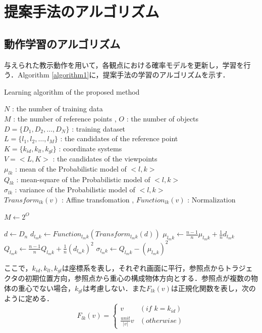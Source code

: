 ﻿\appendix
\chapter{提案手法のアルゴリズム}\label{appendix3}

\section{動作学習のアルゴリズム}

与えられた教示動作を用いて，各観点における確率モデルを更新し，学習を行う．Algorithm \ref{algorithm1}に，提案手法の学習のアルゴリズムを示す．
	\begin{algorithm}[b]
		\caption{ Learning algorithm of the proposed method}
		\label{algorithm1}
		\begin{algorithmic}
			\REQUIRE
				$N$ : the number of training data \\
				$M$ : the number of reference points , 
				$O$ : the number of objects \\
				$D = \{D_{1} , D_{2} , \ldots , D_{N}\}$ : training dataset \\
				$L = \{l_{1} , l_{2} , \ldots , l_{M}\}$ : the candidates of the reference point \\
				$K = \{k_{id} , k_{lt} , k_{gl}\}$ : coordinate systems \\
				$V = <L , K>$ : the candidates of the viewpoints \\
				$μ_{lk}$ : mean of the Probabilistic model of $<l , k>$ \\
				$Q_{lk}$ : mean-square of the Probabilistic model of $<l , k>$ \\
				$σ_{lk}$ : variance of the Probabilistic model of $<l , k>$ \\
				$Transform_{lk}(v)$ : Affine transfomation , 
				$Function_{lk}(v)$ : Normalization
		\end{algorithmic}
		\begin{algorithmic}[1]
			\STATE $M \leftarrow 2^{O}$
			
			\FOR{$n=1$ to $N$}
				\STATE $d \leftarrow D_{n}$
				\FOR{$m=1$ to $M$}
					\FOR{all $k ∈K$}
						\STATE $d_{l_{m}k} \leftarrow Function_{l_{m}k}(Transform_{l_{m}k}(d))$
						\STATE $μ_{l_{m}k} \leftarrow \frac{n-1}{n}μ_{l_{m}k} + \frac{1}{n}d_{l_{m}k}$
						\STATE $Q_{l_{m}k} \leftarrow \frac{n-1}{n}Q_{l_{m}k} + \frac{1}{n}(d_{l_{m}k})^2$
						\STATE $σ_{l_{m}k} \leftarrow Q_{l_{m}k} - (μ_{l_{m}k})^2$
					\ENDFOR
				\ENDFOR
			\ENDFOR
		\end{algorithmic}
	\end{algorithm}
ここで，$k_{id} , k_{lt} , k_{gl}$は座標系を表し，それぞれ画面に平行，参照点からトラジェクタの初期位置方向，参照点から重心の構成物体方向とする．参照点が複数の物体の重心でない場合，$k_{gl}$は考慮しない．また$F_{lk}(v)$は正規化関数を表し，次のように定める．
\[
	F_{lk}(v) = 
	\begin{cases}
		v & (if\,\,k=k_{id}) \\
		\frac{unit}{|v|}v & (otherwise)
	\end{cases}
\]


